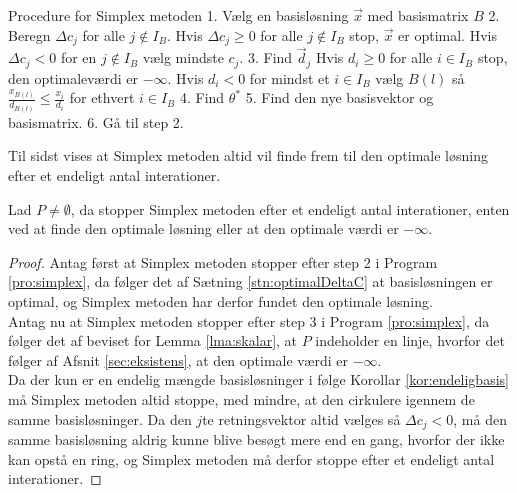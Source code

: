 \begin{pro}[label=pro:simplex,style=ingental]{Procedure for Simplex metoden}
1. Vælg en basisløsning $\vec{x}$ med basismatrix $B$
2. Beregn $\Delta c_j$ for alle $j \notin I_B$. 
   Hvis $\Delta c_j\geq 0$ for alle $j \notin I_B$ 
   	   stop, $\vec{x}$ er optimal.
   Hvis $\Delta c_j < 0$ for en $j \notin I_B$
       vælg mindste $c_j$.
3. Find $\vec{d}_j$
   Hvis $d_i \geq 0 $ for alle $i \in I_B$ 
       stop, den optimaleværdi er $- \infty$.
   Hvis $d_i < 0 $ for mindst et $i \in I_B$ 
       vælg $B(l)$ så $\frac{x_{B(l)}}{d_{B(l)}}\leq \frac{x_i}{d_i} $ for ethvert $i \in I_B$
4. Find $\theta^*$
5. Find den nye basisvektor og basismatrix.
6. Gå til step 2.
\end{pro}

Til sidst vises at Simplex metoden altid vil finde frem til den optimale løsning efter et endeligt antal interationer.
\begin{stn}
Lad $P \neq \emptyset$, da stopper Simplex metoden efter et endeligt antal interationer, enten ved at finde den optimale løsning eller at den optimale værdi er $- \infty$.
\end{stn}
\begin{proof}
Antag først at Simplex metoden stopper efter step 2 i Program \ref{pro:simplex}, da følger det af Sætning \ref{stn:optimalDeltaC}
at basisløsningen er optimal, og Simplex metoden har derfor fundet den optimale løsning.
\\ Antag nu at Simplex metoden stopper efter step 3 i Program \ref{pro:simplex}, da følger det af beviset for Lemma \ref{lma:skalar}, at $P$ indeholder en linje, hvorfor det følger af Afsnit \ref{sec:eksistens},
at den optimale værdi er $-\infty$.
\\ Da der kun er en endelig mængde basisløsninger i følge Korollar \ref{kor:endeligbasis}
må Simplex metoden altid stoppe, med mindre, at den cirkulere igennem de samme basisløsninger.
Da den $j$te retningsvektor altid vælges så $\Delta c_j < 0$, må den samme basisløsning aldrig kunne blive besøgt mere end en gang, hvorfor der ikke kan opstå en ring, og Simplex metoden må derfor stoppe efter et endeligt antal interationer.
\end{proof} 





